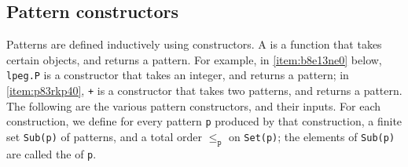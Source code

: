 \documentclass{article}
\begin{document}
\subsection{Pattern constructors}
\label{sec:h34gukwe}

Patterns are defined inductively using constructors.  A
 is a function that takes certain
objects, and returns a pattern.  For example, in \cref{item:b8e13ne0}
below, \verb|lpeg.P| is a constructor that takes an integer, and
returns a pattern; in \cref{item:p83rkp40}, \verb|+| is a constructor
that takes two patterns, and returns a pattern.  The following are the
various pattern constructors, and their inputs.  For each
construction, we define for every pattern \verb|p| produced by that
construction, a finite set \verb|Sub(p)| of patterns, and a total
order \(\leq_\mathtt{p}\) on \verb|Set(p)|; the elements of
\verb|Sub(p)| are called the  of \verb|p|.
\end{document}
